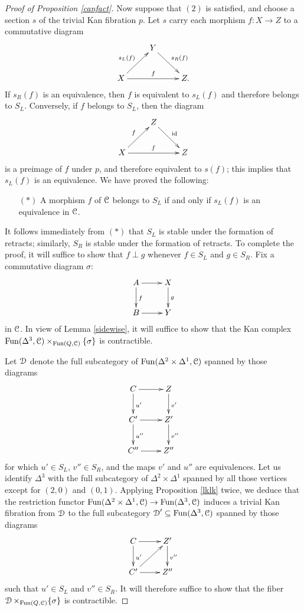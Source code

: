 \begin{proof}[Proof of Proposition \ref{canfact}]
Now suppose that $(2)$ is satisfied, and choose a section $s$ of the trivial Kan fibration $p$.
Let $s$ carry each morphism $f: X \rightarrow Z$ to a commutative diagram
$$ \xymatrix{ & Y \ar[dr]^{s_R(f)} & \\
X \ar[ur]^{ s_L(f)} \ar[rr]^{f} & & Z. }$$
If $s_{R}(f)$ is an equivalence, then $f$ is equivalent to $s_L(f)$ and therefore belongs to
$S_L$. Conversely, if $f$ belongs to $S_L$, then the diagram
$$ \xymatrix{ & Z \ar[dr]^{\id} & \\
X \ar[ur]^{f} \ar[rr]^{f} & & Z }$$
is a preimage of $f$ under $p$, and therefore equivalent to $s(f)$; this implies that
$s_L(f)$ is an equivalence. We have proved the following:
\begin{itemize}
\item[$(\ast)$] A morphism $f$ of $\operatorname{\mathcal{C}}$ belongs to $S_L$ if and only if $s_L(f)$ is an equivalence in $\operatorname{\mathcal{C}}$.
\end{itemize}

It follows immediately from $(\ast)$ that $S_L$ is stable under the formation of retracts; similarly, $S_R$ is stable under the formation of retracts. To complete the proof, it will suffice to show that $f \perp g$ whenever $f \in S_L$ and $g \in S_R$. Fix a commutative diagram $\sigma:$
$$ \xymatrix{ A \ar[d]^{f} \ar[r] & X \ar[d]^{g} \\
B \ar[r] & Y }$$
in $\operatorname{\mathcal{C}}$. In view of Lemma \ref{sidewise}, it will suffice to show that the Kan complex
$\operatorname{Fun}( \Delta^3, \operatorname{\mathcal{C}}) \times_{ \operatorname{Fun}( Q, \operatorname{\mathcal{C}} ) } \{ \sigma \}$ is contractible.

Let $\operatorname{\mathcal{D}}$ denote the full subcategory of $\operatorname{Fun}( \Delta^2 \times \Delta^1, \operatorname{\mathcal{C}})$ spanned by those diagrams
$$ \xymatrix{ C \ar[r] \ar[d]^{u'} & Z \ar[d]^{v'} \\
C' \ar[r] \ar[d]^{u''} & Z' \ar[d]^{v''} \\
C'' \ar[r] & Z'' }$$
for which $u' \in S_L$, $v'' \in S_R$, and the maps $v'$ and $u''$ are equivalences.
Let us identify $\Delta^3$ with the full subcategory of $\Delta^2 \times \Delta^1$ spanned by
all those vertices except for $(2,0)$ and $(0,1)$. Applying Proposition \ref{lklk} twice,
we deduce that the restriction functor $\operatorname{Fun}( \Delta^2 \times \Delta^1, \operatorname{\mathcal{C}}) \rightarrow \operatorname{Fun}( \Delta^3, \operatorname{\mathcal{C}})$ induces a trivial Kan fibration from $\operatorname{\mathcal{D}}$ to the full subcategory
$\operatorname{\mathcal{D}}' \subseteq \operatorname{Fun}(\Delta^3, \operatorname{\mathcal{C}})$ spanned by those diagrams
$$ \xymatrix{ C \ar[d]^{u'} \ar[r] & Z' \ar[d]^{v''} \\
C' \ar[r] \ar[ur] & Z'' }$$
such that $u' \in S_L$ and $v'' \in S_R$. It will therefore suffice to show that the fiber
$\operatorname{\mathcal{D}} \times_{ \operatorname{Fun}(Q, \operatorname{\mathcal{C}})} \{ \sigma \}$ is contractible.


\end{proof}
